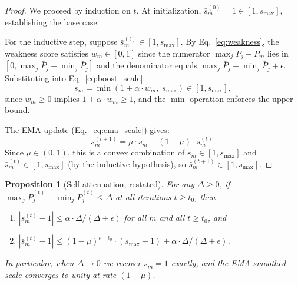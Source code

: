 \documentclass{article}
\newtheorem{proposition}{Proposition}
\begin{document}
\begin{proof}
We proceed by induction on $t$. At initialization, $\bar{s}_m^{(0)} = 1 \in [1, s_{\max}]$, establishing the base case.

For the inductive step, suppose $\bar{s}_m^{(t)} \in [1, s_{\max}]$. By Eq.~\eqref{eq:weakness}, the weakness score satisfies $w_m \in [0, 1]$ since the numerator $\max_j \bar{P}_j - \bar{P}_m$ lies in $[0, \max_j \bar{P}_j - \min_j \bar{P}_j]$ and the denominator equals $\max_j \bar{P}_j - \min_j \bar{P}_j + \epsilon$. Substituting into Eq.~\eqref{eq:boost_scale}:
%
\begin{equation*}
s_m = \min(1 + \alpha \cdot w_m,\; s_{\max}) \in [1, s_{\max}],
\end{equation*}
%
since $w_m \geq 0$ implies $1 + \alpha \cdot w_m \geq 1$, and the $\min$ operation enforces the upper bound.

The EMA update (Eq.~\eqref{eq:ema_scale}) gives:
%
\begin{equation*}
\bar{s}_m^{(t+1)} = \mu \cdot s_m + (1 - \mu) \cdot \bar{s}_m^{(t)}.
\end{equation*}
%
Since $\mu \in (0, 1)$, this is a convex combination of $s_m \in [1, s_{\max}]$ and $\bar{s}_m^{(t)} \in [1, s_{\max}]$ (by the inductive hypothesis), so $\bar{s}_m^{(t+1)} \in [1, s_{\max}]$.
\end{proof}


\begin{proposition}[Self-attenuation, restated]
For any $\Delta \geq 0$, if $\max_j \bar{P}_j^{(t)} - \min_j \bar{P}_j^{(t)} \leq \Delta$ at all iterations $t \geq t_0$, then
\begin{enumerate}
    \item $|s_m^{(t)} - 1| \leq \alpha \cdot \Delta / (\Delta + \epsilon)$ for all $m$ and all $t \geq t_0$, and
    \item $|\bar{s}_m^{(t)} - 1| \leq (1 - \mu)^{t - t_0} \cdot (s_{\max} - 1) + \alpha \cdot \Delta / (\Delta + \epsilon)$.
\end{enumerate}
In particular, when $\Delta \to 0$ we recover $s_m = 1$ exactly, and the EMA-smoothed scale converges to unity at rate $(1-\mu)$.
\end{proposition}
\end{document}
